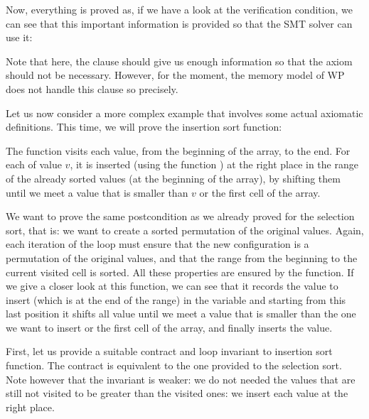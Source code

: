 


Now, everything is proved as, if we have a look at the verification condition,
we can see that this important information is provided so that the SMT solver
can use it:




Note that here, the  clause should give us enough information
so that the axiom  should not be necessary. However, for the
moment, the memory model of WP does not handle this clause so precisely.






Let us now consider a more complex example that involves some actual axiomatic
definitions. This time, we will prove the insertion sort function:





The  function visits each value, from the beginning
of the array, to the end. For each of value $v$, it is inserted (using the
function ) at the right place in the range of the already
sorted values (at the beginning of the array), by shifting them until we meet a
value that is smaller than $v$ or the first cell of the array.




We want to prove the same postcondition as we already proved for the selection
sort, that is: we want to create a sorted permutation of the original values.
Again, each iteration of the loop must ensure that the new configuration is a
permutation of the original values, and that the range from the beginning to
the current visited cell is sorted. All these properties are ensured by the
 function. If we give a closer look at this function, we can
see that it records the value to insert (which is at the end of the range) in
the variable  and starting from this last position it shifts
all value until we meet a value that is smaller than the one we want to insert
or the first cell of the array, and finally inserts the value.




First, let us provide a suitable contract and loop invariant to insertion sort
function. The contract is equivalent to the one provided to the selection sort.
Note however that the invariant is weaker: we do not needed the values that are
still not visited to be greater than the visited ones: we insert each value at
the right place.



